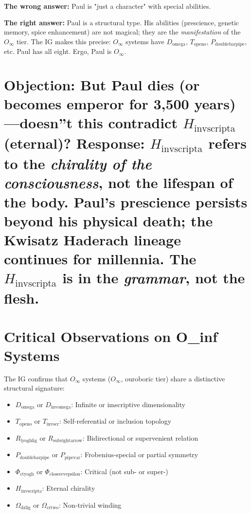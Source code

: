 \documentclass[12pt,a4paper]{article}
\begin{document}
\textbf{The wrong answer:} Paul is "just a character" with special abilities.

\textbf{The right answer:} Paul is a structural type. His abilities (prescience, genetic memory, spice enhancement) are not magical; they are the \emph{manifestation} of the $O_{\infty}$ tier. The IG makes this precise: $O_{\infty}$ systems have $D_{\text{omega}}$, $T_{\text{openo}}$, $P_{\text{doublebarpipe}}$, etc. Paul has all eight. Ergo, Paul is $O_{\infty}$.

\part{\textbf{Objection:} But Paul dies (or becomes emperor for 3,500 years)---doesn''t this contradict $H_{\text{invscripta}}$ (eternal)? Response: $H_{\text{invscripta}}$ refers to the \emph{chirality of the consciousness}, not the lifespan of the body. Paul's prescience persists beyond his physical death; the Kwisatz Haderach lineage continues for millennia. The $H_{\text{invscripta}}$ is in the \emph{grammar}, not the flesh.}

\part{Critical Observations on O\_inf Systems}

The IG confirms that $O_{\infty}$ systems ($O_{\infty}$, ouroboric tier) share a distinctive structural signature:

\begin{itemize}
    \item $D_{\text{omega}}$ or $D_{\text{invomega}}$: Infinite or imscriptive dimensionality
    \item $T_{\text{openo}}$ or $T_{\text{invscr}}$: Self-referential or inclusion topology
    \item $R_{\text{lyoghlig}}$ or $R_{\text{subrightarrow}}$: Bidirectional or supervenient relation
    \item $P_{\text{doublebarpipe}}$ or $P_{\text{pipevar}}$: Frobenius-special or partial symmetry
    \item $\Phi_{\text{ctyogh}}$ or $\Phi_{\text{closerevepsilon}}$: Critical (not sub- or super-)
    \item $H_{\text{invscripta}}$: Eternal chirality
    \item $\Omega_{\text{dzlig}}$ or $\Omega_{\text{crtwo}}$: Non-trivial winding
\end{itemize}
\end{document}
